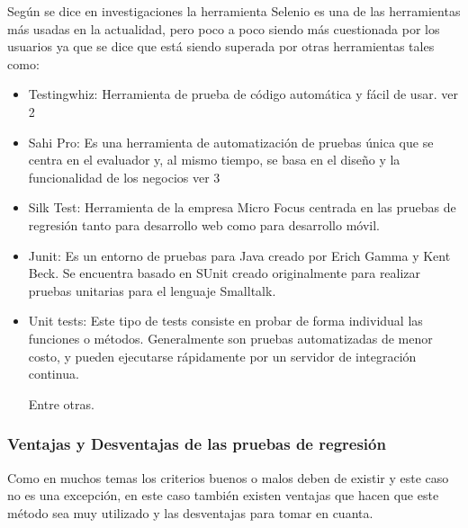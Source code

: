 \documentclass[conference]{IEEEtran}
\begin{document}
Según se dice en investigaciones la herramienta Selenio es una de las herramientas más usadas en la actualidad, pero poco a poco siendo más cuestionada por los usuarios ya que se dice que está siendo superada por otras herramientas tales como:
\begin{itemize}
\item Testingwhiz: Herramienta de prueba de código automática y fácil de usar. ver 2

\item Sahi Pro: Es una herramienta de automatización de pruebas única que se centra en el evaluador y, al mismo tiempo, se basa en el diseño y la funcionalidad de los negocios ver 3

\item Silk Test: Herramienta de la empresa Micro Focus centrada en las pruebas de regresión tanto para desarrollo web como para desarrollo móvil.

\item Junit: Es un entorno de pruebas para Java creado por Erich Gamma y Kent Beck. Se encuentra basado en SUnit creado originalmente para realizar pruebas unitarias para el lenguaje Smalltalk.

\item Unit tests: Este tipo de tests consiste en probar de forma individual las funciones o métodos. Generalmente son pruebas automatizadas de menor costo, y pueden ejecutarse rápidamente por un servidor de integración continua.

Entre otras.

\end{itemize}

\subsubsection{Ventajas y Desventajas de las pruebas de regresión} 

Como en muchos temas los criterios buenos o malos deben de existir y este caso no es una excepción, en este caso también existen ventajas que hacen que este método sea muy utilizado y las desventajas para tomar en cuanta.
\end{document}
